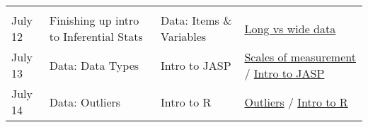 \documentclass[
]{book}
\begin{document}
\begin{longtable}[]{@{}llll@{}}
\begin{minipage}[t]{0.29\columnwidth}
\strut
\end{minipage} & \begin{minipage}[t]{0.18\columnwidth}\raggedright
\strut
\end{minipage}\tabularnewline
\begin{minipage}[t]{0.09\columnwidth}\raggedright
July 12\strut
\end{minipage} & \begin{minipage}[t]{0.32\columnwidth}\raggedright
Finishing up intro to Inferential Stats\strut
\end{minipage} & \begin{minipage}[t]{0.29\columnwidth}\raggedright
Data: Items \& Variables\strut
\end{minipage} & \begin{minipage}[t]{0.18\columnwidth}\raggedright
\href{https://en.wikipedia.org/wiki/Wide_and_narrow_data}{Long vs wide data}\strut
\end{minipage}\tabularnewline
\begin{minipage}[t]{0.09\columnwidth}\raggedright
July 13\strut
\end{minipage} & \begin{minipage}[t]{0.32\columnwidth}\raggedright
Data: Data Types\strut
\end{minipage} & \begin{minipage}[t]{0.29\columnwidth}\raggedright
Intro to JASP\strut
\end{minipage} & \begin{minipage}[t]{0.18\columnwidth}\raggedright
\href{https://learningstatisticswithr.com/book/studydesign.html\#scales}{Scales of measurement} / \href{https://tomfaulkenberry.github.io/JASPbook/chapters/chapter3.pdf}{Intro to JASP}\strut
\end{minipage}\tabularnewline
\begin{minipage}[t]{0.09\columnwidth}\raggedright
July 14\strut
\end{minipage} & \begin{minipage}[t]{0.32\columnwidth}\raggedright
Data: Outliers\strut
\end{minipage} & \begin{minipage}[t]{0.29\columnwidth}\raggedright
Intro to R\strut
\end{minipage} & \begin{minipage}[t]{0.18\columnwidth}\raggedright
\href{https://scholarworks.umass.edu/cgi/viewcontent.cgi?article=1139\&context=pare}{Outliers} / \href{https://learningstatisticswithr.com/book/introR.html}{Intro to R}\strut

\end{minipage}
\end{longtable}
\end{document}
